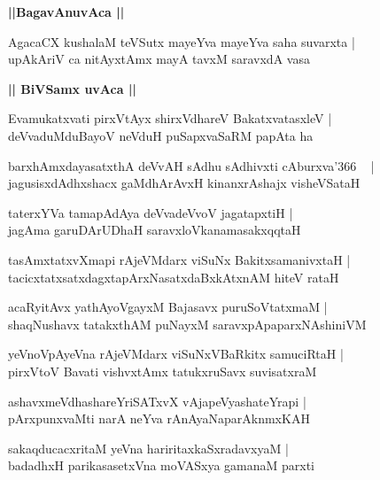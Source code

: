 \documentclass[twoside,12pt,openright]{book}
\newcounter{shloka}[chapter]
\def\uvaca#1{\centerline{{\large\textbf{#1}}}}
\begin{document}
\uvaca{||BagavAnuvAca ||}

\begin{shloka}%
AgacaCX kushalaM teVSutx mayeYva mayeYva saha suvarxta |\\
upAkAriV ca nitAyxtAmx mayA tavxM saravxdA vasa
\end{shloka}

\uvaca{|| BiVSamx uvAca ||}

\begin{shloka}%
Evamukatxvati pirxVtAyx shirxVdhareV BakatxvatasxleV |\\
deVvaduMduBayoV neVduH puSapxvaSaRM papAta ha 
\end{shloka}

\begin{shloka}%
barxhAmxdayasatxthA deVvAH sAdhu sAdhivxti cAburxva\char'366 ~ |\\
jagusisxdAdhxshacx gaMdhArAvxH kinanxrAshajx visheVSataH
\end{shloka}

\begin{shloka}%
taterxYVa tamapAdAya deVvadeVvoV jagatapxtiH |\\
jagAma garuDArUDhaH saravxloVkanamasakxqqtaH 
\end{shloka}

\begin{shloka}%
tasAmxtatxvXmapi rAjeVMdarx viSuNx BakitxsamanivxtaH |\\
tacicxtatxsatxdagxtapArxNasatxdaBxkAtxnAM hiteV rataH 
\end{shloka}

\begin{shloka}%
acaRyitAvx yathAyoVgayxM Bajasavx puruSoVtatxmaM |\\
shaqNushavx tatakxthAM puNayxM saravxpApaparxNAshiniVM 
\end{shloka}

\begin{shloka}%
yeVnoVpAyeVna rAjeVMdarx viSuNxVBaRkitx samuciRtaH |\\
pirxVtoV Bavati vishvxtAmx tatukxruSavx suvisatxraM 
\end{shloka}

\begin{shloka}%
ashavxmeVdhashareYriSATxvX vAjapeVyashateYrapi |\\
pArxpunxvaMti narA neYva rAnAyaNaparAknmxKAH 
\end{shloka}

\begin{shloka}%
sakaqducacxritaM yeVna hariritaxkaSxradavxyaM |\\
badadhxH parikasasetxVna moVASxya gamanaM parxti 
\end{shloka}
\end{document}
